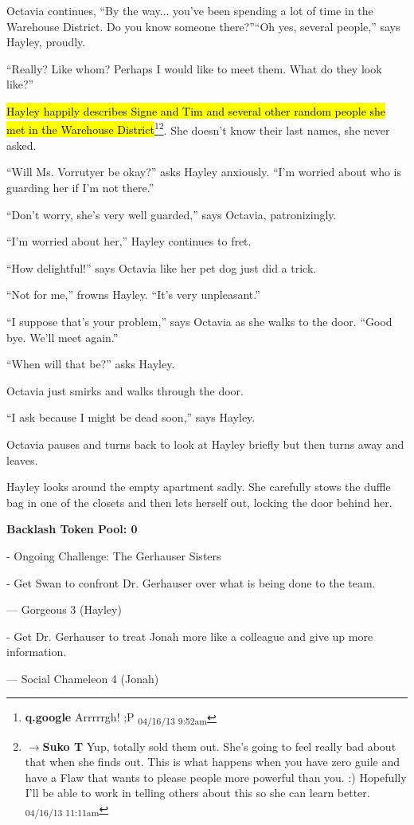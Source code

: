 Octavia continues, ``By the way... you've been spending a lot of time in the Warehouse District.  Do you know someone there?''``Oh yes, several people,'' says Hayley, proudly.

``Really? Like whom?  Perhaps I would like to meet them.  What do they look like?''

\hl{Hayley happily describes Signe and Tim and several other random people she met in the Warehouse District}\footnote{\textbf{q.google }Arrrrrgh! ;P \textsubscript{04/16/13 9:52am}}\footnote{$\rightarrow$\textbf{Suko T }Yup, totally sold them out.  She's going to feel really bad about that when she finds out. This is what happens when you have zero guile and have a Flaw that wants to please people more powerful than you. :)  Hopefully I'll be able to work in telling others about this so she can learn better. \textsubscript{04/16/13 11:11am}}.  She doesn't know their last names, she never asked.

``Will Ms. Vorrutyer be okay?'' asks Hayley anxiously.  ``I'm worried about who is guarding her if I'm not there.''

``Don't worry, she's very well guarded,'' says Octavia, patronizingly.

``I'm worried about her,'' Hayley continues to fret.

``How delightful!'' says Octavia like her pet dog just did a trick.

``Not for me,'' frowns Hayley.  ``It's very unpleasant.''

``I suppose that's your problem,'' says Octavia as she walks to the door.  ``Good bye.  We'll meet again.''

``When will that be?'' asks Hayley.

Octavia just smirks and walks through the door.

``I ask because I might be dead soon,'' says Hayley.

Octavia pauses and turns back to look at Hayley briefly but then turns away and leaves.



Hayley looks around the empty apartment sadly.  She carefully stows the duffle bag in one of the closets and then lets herself out, locking the door behind her.


\textbf{Backlash Token Pool: 0}


{
\parskip=0pt
- Ongoing Challenge: The Gerhauser Sisters 

- Get Swan to confront Dr. Gerhauser over what is being done to the team.

--- Gorgeous 3 (Hayley)

- Get Dr. Gerhauser to treat Jonah more like a colleague and give up more information.

--- Social Chameleon 4 (Jonah)


}

